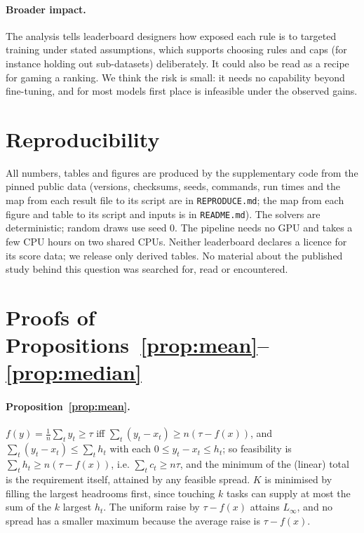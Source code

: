 \documentclass{article}
\begin{document}
\paragraph{Broader impact.}
The analysis tells leaderboard designers how exposed each rule is to targeted training under stated assumptions, which supports choosing rules and caps (for instance holding out sub-datasets) deliberately. It could also be read as a recipe for gaming a ranking. We think the risk is small: it needs no capability beyond fine-tuning, and for most models first place is infeasible under the observed gains.

\section{Reproducibility}
\label{sec:repro}
All numbers, tables and figures are produced by the supplementary code from the pinned public data (versions, checksums, seeds, commands, run times and the map from each result file to its script are in \texttt{REPRODUCE.md}; the map from each figure and table to its script and inputs is in \texttt{README.md}). The solvers are deterministic; random draws use seed 0. The pipeline needs no GPU and takes a few CPU hours on two shared CPUs. Neither leaderboard declares a licence for its score data; we release only derived tables. No material about the published study behind this question was searched for, read or encountered.





\appendix
\section{Proofs of Propositions~\ref{prop:mean}--\ref{prop:median}}
\label{app:proofs}
\paragraph{Proposition~\ref{prop:mean}.} $f(y)=\frac1n\sum_t y_t\ge\tau$ iff $\sum_t(y_t-x_t)\ge n(\tau-f(x))$, and $\sum_t(y_t-x_t)\le\sum_t h_t$ with each $0\le y_t-x_t\le h_t$; so feasibility is $\sum_t h_t\ge n(\tau-f(x))$, i.e. $\sum_t c_t\ge n\tau$, and the minimum of the (linear) total is the requirement itself, attained by any feasible spread. $K$ is minimised by filling the largest headrooms first, since touching $k$ tasks can supply at most the sum of the $k$ largest $h_t$. The uniform raise by $\tau-f(x)$ attains $L_\infty$, and no spread has a smaller maximum because the average raise is $\tau-f(x)$.
\end{document}
